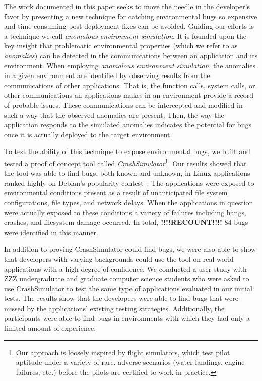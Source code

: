 The work documented in this paper
seeks to move the needle in the developer's favor
by presenting a new technique for catching environmental bugs
so expensive and time consuming post-deployment fixes can be avoided.
Guiding our efforts
is a technique
we call \textit{anomalous environment simulation}.
It is founded upon the key insight
that problematic environmental properties
(which we refer to as \textit{anomalies})
can be detected in the communications
between an application and its environment.
When employing \textit{anomalous environment simulation},
the anomalies in a given environment
are identified by
observing results from the communications of other applications.
That is,
the function calls,
system calls,
or other communications an applications makes in an environment provide
a record of probable issues.
These communications can be intercepted
and modified in such a way
that the observed anomalies are present.
Then, the way the application responds to the simulated anomalies
indicates the potential for bugs once it is actually deployed
to the target environment.

To test the ability of this technique to expose environmental
bugs, we built and tested a proof of concept tool
called {\em CrashSimulator}\footnote{Our approach is
loosely inspired by flight simulators, which test pilot aptitude under a
variety of rare, adverse scenarios (water landings, engine failures, etc.)
before the pilots are certified to work in practice.}.
Our results showed that the tool was able to find bugs,
both known and unknown,
in Linux applications ranked highly on Debian's popularity
contest~\cite{DebPopCon}.  The applications were exposed to
environmental conditions present as a result of unanticipated
file system configurations, file types, and network delays.
When the applications in
question were actually exposed to these conditions a variety of failures
including hangs, crashes, and filesystem damage occurred.  In total,
\textbf{!!!!RECOUNT!!!!} 84
bugs were identified in this manner.

In addition to proving CrashSimulator could find bugs, we were also able to
show that developers with varying backgrounds
could use the tool
on real world applications
with a high degree of confidence.
We conducted a user study with
ZZZ undergraduate and graduate computer science students
who were asked to use CrashSimulator to test
the same type of applications evaluated in our initial tests.
The results show that the developers were able to find bugs
that were missed by the applications' existing testing strategies.
Additionally, the
participants were able to find bugs
in environments with which they had only a limited amount of experience.

